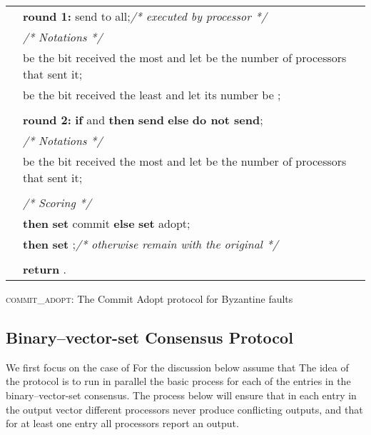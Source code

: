 \documentclass[11pt]{article}
\newcommand{\tb}{\makebox[0.6cm]{}}
\newcommand{\due}{\makebox[1cm]{}}
\newcommand{\ca}{{\small\textsc{commit\!\_adopt}}\xspace}
\begin{document}
\begin{algorithm}[!ht]
\footnotesize
{}
 \setcounter{AlgoLine}{0}
\begin{tabular}{ r l }
\lnl{line:vote1} &  {\bf round 1:}   send  to all;\hspace{2.2in}\hfill\textit{/* executed by processor  */}\\
\nl & \tb\due \textit{/* Notations */}\\
\lnl{line:1st}& \tb\due {\bf let}  be the bit received the most and let be the number of processors that sent it;\\
\nl & \tb\due {\bf let}  be the bit received the least and let its number be ;\\
\\
\lnl{line:test}&  {\bf round 2:}  {\bf if}  and  {\bf then} {\bf send}    {\bf else} {\bf do not send};\\
\nl & \tb\due \textit{/* Notations */}\\
\nl & \tb\due {\bf let}  be the bit received the most and let  be the number of processors that sent it;\\
\\
\nl &  \textit{/* Scoring */}\\
\lnl{line:commit}& \tb {\bf if}   {\bf then} {\bf set}  {\sc commit}  {\bf else} {\bf set}  {\sc adopt};\\
\lnl{line:value}& \tb {\bf if}  {\bf then} {\bf set}  ;\hfill\textit{/* otherwise remain with the original  */}\\
\\
\nl & {\bf return} .
\end{tabular}
 \caption{ \ca\!: The Commit Adopt protocol for Byzantine faults}\label{figure:ca}
\end{algorithm}



\subsection{Binary--vector-set Consensus Protocol}



We first focus on the case of   For the discussion below assume that  
The idea of the protocol is to run in parallel the basic process for each of the  entries in the binary--vector-set consensus.  The process below will ensure that in each entry in the output vector different processors never produce conflicting outputs, and that for at least one entry all processors report an output.
\end{document}
